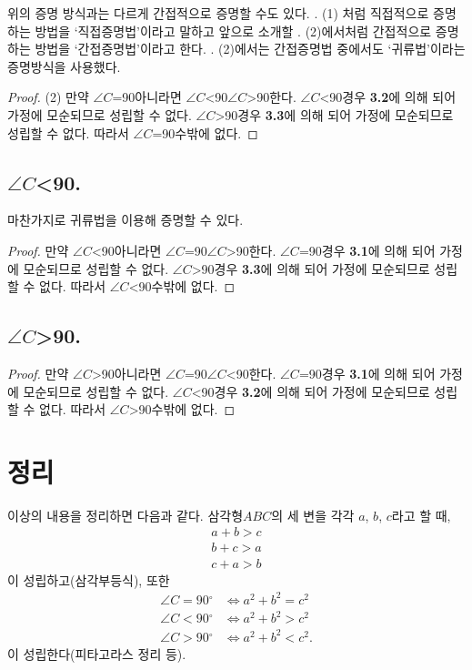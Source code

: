 \documentclass{article}
\newcommand{\C}{\ensuremath{\angle C}}
\newcommand{\D}{\ensuremath{{}^\circ}}
\newcommand{\PP}{\ensuremath{a^2+b^2=c^2}}
\newcommand{\PPP}{\ensuremath{a^2+b^2>c^2}}
\newcommand{\PPPP}{\ensuremath{a^2+b^2<c^2}}
\begin{document}
위의 증명 방식과는 다르게 간접적으로 증명할 수도 있다.
{}. (1) 처럼 직접적으로 증명하는 방법을 `직접증명법'이라고 말하고 앞으로 소개할 {}. (2)에서처럼 간접적으로 증명하는 방법을 `간접증명법'이라고 한다.
{}. (2)에서는 간접증명법 중에서도 `귀류법'이라는 증명방식을 사용했다.
\begin{proof}(2)
만약 \C=90 아니라면 \C<90 \C>90 한다.
\C<90 경우 \textbf{3.2}에 의해  되어  가정에 모순되므로 성립할 수 없다.
\C>90 경우 \textbf{3.3}에 의해  되어  가정에 모순되므로 성립할 수 없다.
따라서 \C=90 수밖에 없다.
\end{proof}

\subsection{ \C<90.}
마찬가지로 귀류법을 이용해 증명할 수 있다.
\begin{proof}
만약 \C<90 아니라면 \C=90 \C>90 한다.
\C=90 경우 \textbf{3.1}에 의해  되어  가정에 모순되므로 성립할 수 없다.
\C>90 경우 \textbf{3.3}에 의해  되어  가정에 모순되므로 성립할 수 없다.
따라서 \C<90 수밖에 없다.
\end{proof}

\subsection{ \C>90.}
\begin{proof}
만약 \C>90 아니라면 \C=90 \C<90 한다.
\C=90 경우 \textbf{3.1}에 의해  되어  가정에 모순되므로 성립할 수 없다.
\C<90 경우 \textbf{3.2}에 의해  되어  가정에 모순되므로 성립할 수 없다.
따라서 \C>90 수밖에 없다.
\end{proof}

\section{정리}
이상의 내용을 정리하면 다음과 같다.
삼각형\(ABC\)의 세 변을 각각 \(a\), \(b\), \(c\)라고 할 때,
\begin{gather*}
a+b>c\\
b+c>a\\
c+a>b
\end{gather*}
이 성립하고(삼각부등식), 또한
\begin{align*}
 \C=90\D&\iff\PP\\
 \C<90\D&\iff\PPP\\
 \C>90\D&\iff\PPPP.
\end{align*}
이 성립한다(피타고라스 정리 등).

\end{document}
